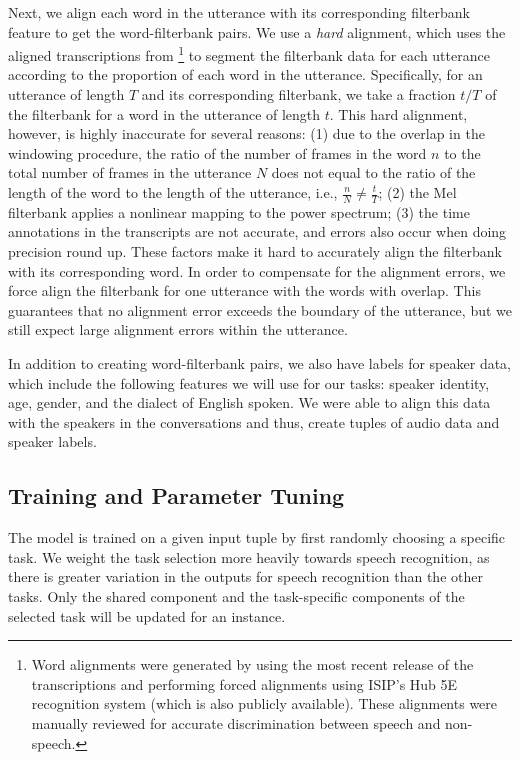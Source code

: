 \documentclass{article}
\begin{document}
Next, we align each word in the utterance with its corresponding filterbank feature to get the word-filterbank pairs. We use a \emph{hard} alignment, which uses the aligned transcriptions from \footnote{Word alignments were generated by using the most recent release of the transcriptions and performing forced alignments using ISIP's Hub 5E recognition system (which is also publicly available). These alignments were manually reviewed for accurate discrimination between speech and non-speech.\cite{switchboard}} to segment the filterbank data for each utterance according to the proportion of each word in the utterance. Specifically, for an utterance of length $T$ and its corresponding filterbank, we take a fraction $t/T$ of the filterbank for a word in the utterance of length $t$. This hard alignment, however, is highly inaccurate for several reasons: (1) due to the overlap in the windowing procedure, the ratio of the number of frames in the word $n$ to the total number of frames in the utterance $N$ does not equal to the ratio of the length of the word to the length of the utterance, i.e., $\frac{n}{N} \neq \frac{t}{T}$; (2) the Mel filterbank applies a nonlinear mapping to the power spectrum; (3) the time annotations in the transcripts are not accurate, and errors also occur when doing precision round up. These factors make it hard to accurately align the filterbank with its corresponding word. In order to compensate for the alignment errors, we force align the filterbank for one utterance with the words with overlap. This guarantees that no alignment error exceeds the boundary of the utterance, but we still expect large alignment errors within the utterance. 

In addition to creating word-filterbank pairs, we also have labels for speaker data, which include the following features we will use for our tasks: speaker identity, age, gender, and the dialect of English spoken. We were able to align this data with the speakers in the conversations and thus, create tuples of audio data and speaker labels.

\subsection{Training and Parameter Tuning}
The model is trained on a given input tuple by first randomly choosing a specific task.  We weight the task selection more heavily towards speech recognition, as there is greater variation in the outputs for speech recognition than the other tasks.  Only the shared component and the task-specific components of the selected task will be updated for an instance. 
\end{document}
